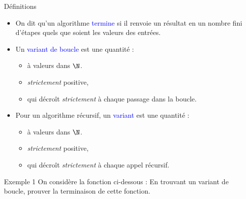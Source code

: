 \documentclass[10pt]{beamer}
\begin{document}
\begin{frame}[fragile]{\Ctitle}{\stitle}
\begin{block}{\textcolor{gray}{\small \rappel \;} Définitions}
    \begin{itemize}
        \item<2-> On dit qu'un algorithme \textcolor{blue}{termine} si il renvoie un résultat en un nombre fini d'étapes quels que soient les valeurs des entrées.
        \item<3-> Un \textcolor{blue}{variant de boucle} est une quantité :
            \begin{itemize}
            \item<4-> à valeurs dans $\N$.
            \item<4-> \textit{strictement} positive, 
            \item<5-> qui décroît \textit{strictement} à chaque passage dans la boucle.
            \end{itemize}
        \item<6-> Pour un algorithme récursif, un \textcolor{blue}{variant} est une quantité :
        \begin{itemize}
            \item<7-> à valeurs dans $\N$.
            \item<7-> \textit{strictement} positive, 
            \item<8-> qui décroît \textit{strictement} à chaque appel récursif.
        \end{itemize}
    \end{itemize}
\end{block}
\end{frame}

\begin{frame}[fragile]{\Ctitle}{\stitle}
\begin{exampleblock}{Exemple 1}
    On considère la fonction ci-dessous :
     En trouvant un variant de boucle, prouver la terminaison de cette fonction.
\end{exampleblock}
\end{frame}
\end{document}
